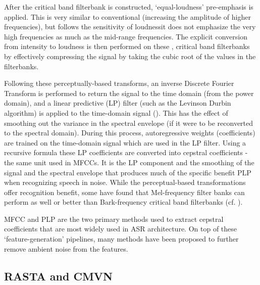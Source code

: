 After the critical band filterbank is constructed, `equal-loudness' pre-emphasis is applied.  This is very similar to conventional \DIFdelbegin {}\DIFdelend \DIFaddbegin {}\DIFaddend (increasing the amplitude of higher frequencies), but follows the \DIFdelbegin {}\DIFdelend \DIFaddbegin {}\DIFaddend sensitivity of loudness\DIFdelbegin {}\DIFdelend \DIFaddbegin \DIFadd{; }\DIFaddend it does not emphasize the very high frequencies as much as the mid-range frequencies. %
The explicit conversion from intensity to loudness is then performed on these \DIFdelbegin {}\DIFdelend \DIFaddbegin {}\DIFaddend , critical band filterbanks by effectively compressing the signal by taking the cubic root of the values in the filterbanks.

Following these perceptually-based transforms, an inverse Discrete Fourier Transform is performed to return the signal to the time domain (from the power domain), and a linear predictive (LP) filter (such as the Levinson Durbin algorithm) is applied to the time-domain signal (\cite{gold:11}).  This has the effect of smoothing out the variance in the spectral envelope (if it were to be reconverted to the spectral domain).  During this process, autoregressive weights (coefficients) are trained on the time-domain signal which are used in the LP filter.  Using a recursive formula these LP coefficients are converted into cepstral coefficients - the same unit used in MFCCs.  It is the LP component \DIFdelbegin \DIFdel{, }\DIFdelend and the smoothing of the signal and \DIFdelbegin {}\DIFdelend the spectral envelope \DIFdelbegin \DIFdel{, }\DIFdelend that produces much of the specific benefit \DIFdelbegin {}\DIFdelend \DIFaddbegin {}\DIFaddend PLP when recognizing speech in noise.  While the perceptual-based transformations offer recognition benefit, some have found that Mel-frequency filter banks can perform as well or better than Bark-frequency critical band filterbanks (cf. \cite{honig:05}).

MFCC and PLP are the two primary methods used to extract cepstral coefficients that are most widely used in ASR architecture.  On top of these `feature-generation' pipelines, many methods have been proposed to further remove ambient noise from the features.

\DIFdelbegin \subsubsection{}%
\addtocounter{subsubsection}{-1}%
\DIFdelend \DIFaddbegin \subsection{RASTA and CMVN}\DIFaddend \label{sec:rasta_cmvn}

